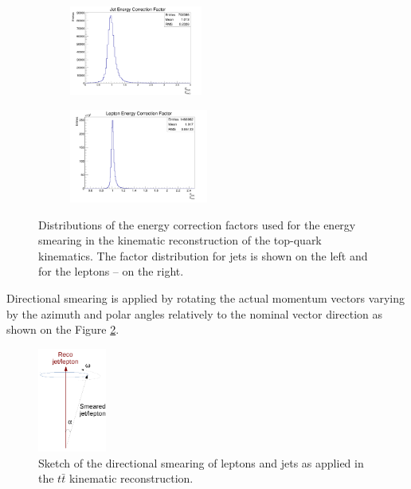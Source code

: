 \begin{figure}[t]
\centering
\begin{subfigure}
  \centering
  \includegraphics[width=0.48\textwidth]{05_kinReco/plots/fE_jet.png}
\end{subfigure}
\begin{subfigure}
  \centering
  \includegraphics[width=0.50\textwidth]{05_kinReco/plots/fE_lep.png}
\end{subfigure}
\caption{Distributions of the energy correction factors used for the energy smearing in the kinematic
reconstruction of the top-quark kinematics. The factor distribution for jets is shown on the left and for
the leptons -- on the right.}
\label{fig:fE}
\end{figure}

Directional smearing is applied by rotating the actual momentum vectors varying by the azimuth and polar angles relatively to the nominal vector direction
as shown on the Figure \ref{fig:angleRot}. 
\begin{figure}[h]
 \centering
 \includegraphics[width=0.2\textwidth]{05_kinReco/plots/angle_rot.pdf}
 \caption{Sketch of the directional smearing of leptons and jets as applied in the $t\bar{t}$ kinematic reconstruction.}
 \label{fig:angleRot}
\end{figure}

